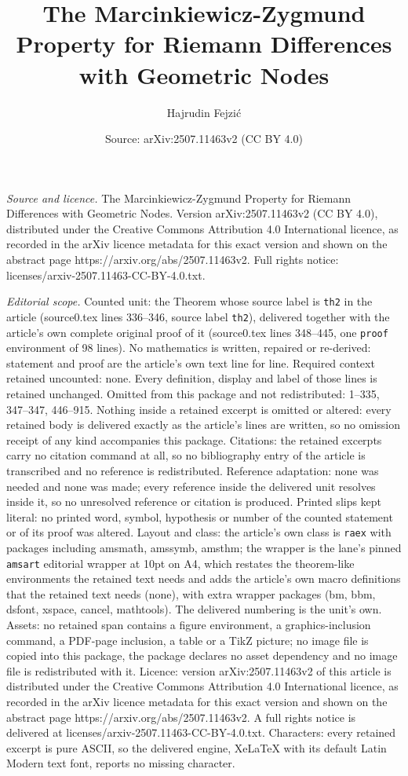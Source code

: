\documentclass[10pt,a4paper]{amsart}
\title[The Marcinkiewicz-Zygmund Property for Riemann Differences w]{The Marcinkiewicz-Zygmund Property for Riemann Differences with Geometric Nodes}
\author{Hajrudin Fejzi\'c}
\date{Source: arXiv:2507.11463v2 (CC BY 4.0)}
\begin{document}
\maketitle

\noindent\emph{Source and licence.} The Marcinkiewicz-Zygmund Property for Riemann Differences with Geometric Nodes. Version arXiv:2507.11463v2 (CC BY 4.0), distributed under the Creative Commons Attribution 4.0 International licence, as recorded in the arXiv licence metadata for this exact version and shown on the abstract page https://arxiv.org/abs/2507.11463v2. Full rights notice: licenses/arxiv-2507.11463-CC-BY-4.0.txt.\par\smallskip

\noindent\textit{Editorial scope.} Counted unit: the Theorem whose source label is \texttt{th2} in the article (source0.tex lines 336--346, source label \texttt{th2}), delivered together with the article's own complete original proof of it (source0.tex lines 348--445, one \texttt{proof} environment of 98 lines). No mathematics is written, repaired or re-derived: statement and proof are the article's own text line for line. Required context retained uncounted: none. Every definition, display and label of those lines is retained unchanged. Omitted from this package and not redistributed: 1--335, 347--347, 446--915. Nothing inside a retained excerpt is omitted or altered: every retained body is delivered exactly as the article's lines are written, so no omission receipt of any kind accompanies this package. Citations: the retained excerpts carry no citation command at all, so no bibliography entry of the article is transcribed and no reference is redistributed. Reference adaptation: none was needed and none was made; every reference inside the delivered unit resolves inside it, so no unresolved reference or citation is produced. Printed slips kept literal: no printed word, symbol, hypothesis or number of the counted statement or of its proof was altered. Layout and class: the article's own class is \texttt{raex} with packages including amsmath, amssymb, amsthm; the wrapper is the lane's pinned \texttt{amsart} editorial wrapper at 10pt on A4, which restates the theorem-like environments the retained text needs and adds the article's own macro definitions that the retained text needs (none), with extra wrapper packages (bm, bbm, dsfont, xspace, cancel, mathtools). The delivered numbering is the unit's own. Assets: no retained span contains a figure environment, a graphics-inclusion command, a PDF-page inclusion, a table or a TikZ picture; no image file is copied into this package, the package declares no asset dependency and no image file is redistributed with it. Licence: version arXiv:2507.11463v2 of this article is distributed under the Creative Commons Attribution 4.0 International licence, as recorded in the arXiv licence metadata for this exact version and shown on the abstract page https://arxiv.org/abs/2507.11463v2. A full rights notice is delivered at licenses/arxiv-2507.11463-CC-BY-4.0.txt. Characters: every retained excerpt is pure ASCII, so the delivered engine, XeLaTeX with its default Latin Modern text font, reports no missing character.
\end{document}
